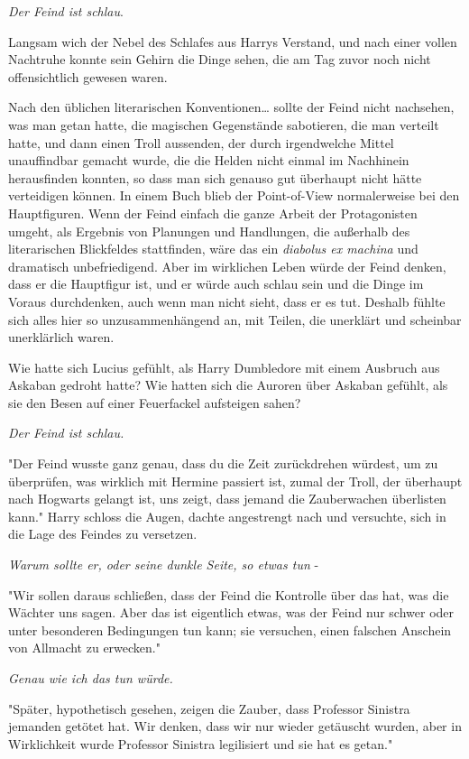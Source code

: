 {\emph{Der Feind ist schlau}.

Langsam wich der Nebel des Schlafes aus Harrys Verstand, und nach einer vollen Nachtruhe konnte sein Gehirn die Dinge sehen, die am Tag zuvor noch nicht offensichtlich gewesen waren.

Nach den üblichen literarischen Konventionen… sollte der Feind nicht nachsehen, was man getan hatte, die magischen Gegenstände sabotieren, die man verteilt hatte, und dann einen Troll aussenden, der durch irgendwelche Mittel unauffindbar gemacht wurde, die die Helden nicht einmal im Nachhinein herausfinden konnten, so dass man sich genauso gut überhaupt nicht hätte verteidigen können. In einem Buch blieb der Point-of-View normalerweise bei den Hauptfiguren. Wenn der Feind einfach die ganze Arbeit der Protagonisten umgeht, als Ergebnis von Planungen und Handlungen, die außerhalb des literarischen Blickfeldes stattfinden, wäre das ein \emph{diabolus ex machina} und dramatisch unbefriedigend. Aber im wirklichen Leben würde der Feind denken, dass er die Hauptfigur ist, und er würde auch schlau sein und die Dinge im Voraus durchdenken, auch wenn man nicht sieht, dass er es tut. Deshalb fühlte sich alles hier so unzusammenhängend an, mit Teilen, die unerklärt und scheinbar unerklärlich waren.

Wie hatte sich Lucius gefühlt, als Harry Dumbledore mit einem Ausbruch aus Askaban gedroht hatte? Wie hatten sich die Auroren über Askaban gefühlt, als sie den Besen auf einer Feuerfackel aufsteigen sahen?

\emph{Der Feind ist schlau.}

"Der Feind wusste ganz genau, dass du die Zeit zurückdrehen würdest, um zu überprüfen, was wirklich mit Hermine passiert ist, zumal der Troll, der überhaupt nach Hogwarts gelangt ist, uns zeigt, dass jemand die Zauberwachen überlisten kann." Harry schloss die Augen, dachte angestrengt nach und versuchte, sich in die Lage des Feindes zu versetzen.

\emph{Warum sollte er, oder seine dunkle Seite, so etwas tun} -

"Wir sollen daraus schließen, dass der Feind die Kontrolle über das hat, was die Wächter uns sagen. Aber das ist eigentlich etwas, was der Feind nur schwer oder unter besonderen Bedingungen tun kann; sie versuchen, einen falschen Anschein von Allmacht zu erwecken."

\emph{Genau wie ich das tun würde.}

"Später, hypothetisch gesehen, zeigen die Zauber, dass Professor Sinistra jemanden getötet hat. Wir denken, dass wir nur wieder getäuscht wurden, aber in Wirklichkeit wurde Professor Sinistra legilisiert und sie hat es getan."

}
